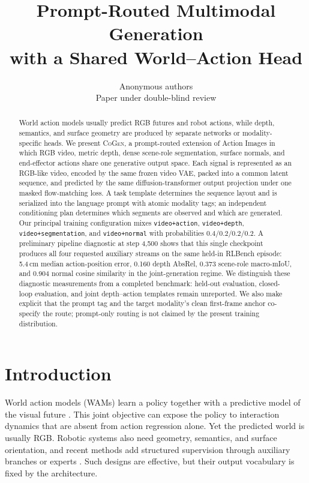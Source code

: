 \documentclass{article}
\title{Prompt-Routed Multimodal Generation\\with a Shared World--Action Head}
\author{Anonymous authors\\Paper under double-blind review}
\newcommand{\method}{\textsc{CoGen}}
\newcommand{\code}[1]{\texttt{#1}}
\begin{document}
\maketitle

\begin{abstract}
World action models usually predict RGB futures and robot actions, while depth, semantics, and
surface geometry are produced by separate networks or modality-specific heads. We present
\method, a prompt-routed extension of Action Images in which RGB video, metric depth, dense
scene-role segmentation, surface normals, and end-effector actions share one generative output
space. Each signal is represented as an RGB-like video, encoded by the same frozen video VAE,
packed into a common latent sequence, and predicted by the same diffusion-transformer output
projection under one masked flow-matching loss. A task template determines the sequence layout
and is serialized into the language prompt with atomic modality tags; an independent
conditioning plan determines which segments are observed and which are generated. Our principal
training configuration mixes \code{video+action}, \code{video+depth},
\code{video+segmentation}, and \code{video+normal} with probabilities
$0.4/0.2/0.2/0.2$. A preliminary pipeline diagnostic at step 4,500 shows that this single
checkpoint produces all four requested auxiliary streams on the same held-in RLBench episode:
5.4\,cm median action-position error, 0.160 depth AbsRel, 0.373 scene-role macro-mIoU, and
0.904 normal cosine similarity in the joint-generation regime. We distinguish these diagnostic
measurements from a completed benchmark: held-out evaluation, closed-loop evaluation, and
joint depth--action templates remain unreported. We also make explicit that the prompt tag and
the target modality's clean first-frame anchor co-specify the route; prompt-only routing is not
claimed by the present training distribution.
\end{abstract}

\section{Introduction}

World action models (WAMs) learn a policy together with a predictive model of the visual future
\citep{zhu2025unified,zhen2026action}. This joint objective can expose the policy to interaction
dynamics that are absent from action regression alone. Yet the predicted world is usually RGB.
Robotic systems also need geometry, semantics, and surface orientation, and recent methods add
structured supervision through auxiliary branches or experts
\citep{ma2026geosem,yuan2026dreamwam,zhao2026rynnworld}. Such designs are effective, but their
output vocabulary is fixed by the architecture.
\end{document}
